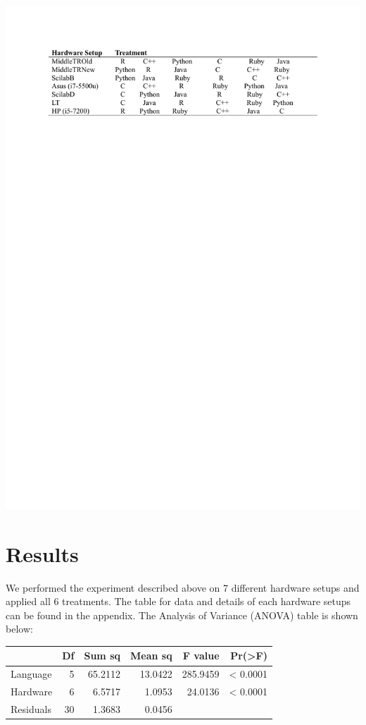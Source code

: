 \documentclass[12pt,halfline,a4paper,]{ouparticle}
\begin{document}
\includegraphics[width=1\linewidth]{diagram}

\newpage

\hypertarget{results}{%
\section{Results}\label{results}}

We performed the experiment described above on 7 different hardware
setups and applied all 6 treatments. The table for data and details of
each hardware setups can be found in the appendix. The Analysis of
Variance (ANOVA) table is shown below:

\begin{longtable}[]{@{}lrrrrr@{}}
\toprule\noalign{}
& Df & Sum sq & Mean sq & F value & Pr(\textgreater F) \\
\midrule\noalign{}
\endhead
\bottomrule\noalign{}
\endlastfoot
Language & 5 & 65.2112 & 13.0422 & 285.9459 & \textless{} 0.0001 \\
Hardware & 6 & 6.5717 & 1.0953 & 24.0136 & \textless{} 0.0001 \\
Residuals & 30 & 1.3683 & 0.0456 & & \\
\end{longtable}
\end{document}
